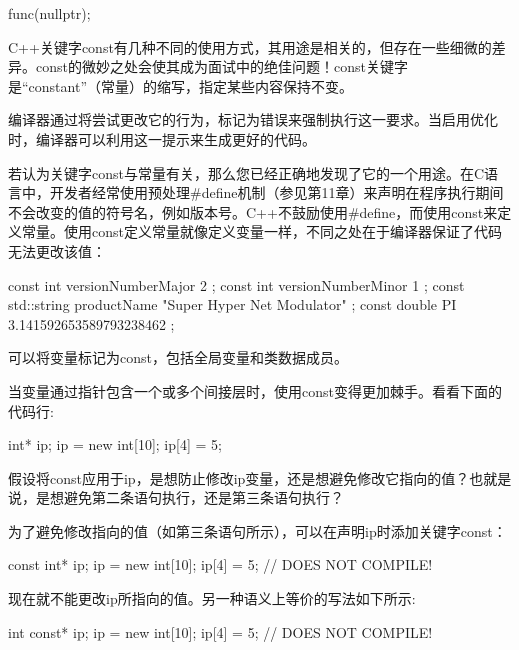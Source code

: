 \begin{cpp}
func(nullptr);
\end{cpp}


C++关键字const有几种不同的使用方式，其用途是相关的，但存在一些细微的差异。const的微妙之处会使其成为面试中的绝佳问题！const关键字是“constant”（常量）的缩写，指定某些内容保持不变。

编译器通过将尝试更改它的行为，标记为错误来强制执行这一要求。当启用优化时，编译器可以利用这一提示来生成更好的代码。


若认为关键字const与常量有关，那么您已经正确地发现了它的一个用途。在C语言中，开发者经常使用预处理\#define机制（参见第11章）来声明在程序执行期间不会改变的值的符号名，例如版本号。C++不鼓励使用\#define，而使用const来定义常量。使用const定义常量就像定义变量一样，不同之处在于编译器保证了代码无法更改该值：

\begin{cpp}
const int versionNumberMajor { 2 };
const int versionNumberMinor { 1 };
const std::string productName { "Super Hyper Net Modulator" };
const double PI { 3.141592653589793238462 };
\end{cpp}

可以将变量标记为const，包括全局变量和类数据成员。


当变量通过指针包含一个或多个间接层时，使用const变得更加棘手。看看下面的代码行:

\begin{cpp}
int* ip;
ip = new int[10];
ip[4] = 5;
\end{cpp}

假设将const应用于ip，是想防止修改ip变量，还是想避免修改它指向的值？也就是说，是想避免第二条语句执行，还是第三条语句执行？

为了避免修改指向的值（如第三条语句所示），可以在声明ip时添加关键字const：

\begin{cpp}
const int* ip;
ip = new int[10];
ip[4] = 5; // DOES NOT COMPILE!
\end{cpp}

现在就不能更改ip所指向的值。另一种语义上等价的写法如下所示:

\begin{cpp}
int const* ip;
ip = new int[10];
ip[4] = 5; // DOES NOT COMPILE!
\end{cpp}

